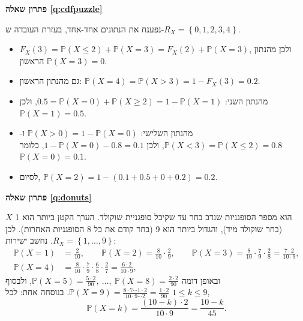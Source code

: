 \documentclass[11pt,a4paper]{report}
\newcommand{\set}[1]{\left\{#1\right\}}
\newcommand{\PP}{\mathbb{P}}
\newenvironment{solution}[1]{\par\bigskip\noindent
  {\sffamily\bfseries\color{thmc}פתרון שאלה \ref{q:#1}}\par\nopagebreak\smallskip}%
  {\par\medskip\noindent{\color{exc!50}\rule{\linewidth}{0.4pt}}\par}
\newcommand{\ans}[1]{\boxed{#1}}
\begin{document}
\begin{solution}{cdfpuzzle}
נפענח את הנתונים אחד-אחד, בעזרת העובדה ש-$R_X=\set{0,1,2,3,4}$.
\begin{itemize}
  \item $F_X(3)=\PP(X\le2)+\PP(X=3)=F_X(2)+\PP(X=3)$, ולכן מהנתון הראשון $\ans{\PP(X=3)=0}$.
  \item גם מהנתון הראשון: $\PP(X=4)=\PP(X>3)=1-F_X(3)=\ans{0.2}$.
  \item מהנתון השני: $0.5=\PP(X=0)+\PP(X\ge2)=1-\PP(X=1)$, ולכן $\ans{\PP(X=1)=0.5}$.
  \item מהנתון השלישי: $\PP(X>0)=1-\PP(X=0)$ ו-$\PP(X<3)=\PP(X\le2)=0.8$, ולכן $1-\PP(X=0)-0.8=0.1$, כלומר $\ans{\PP(X=0)=0.1}$.
  \item לסיום, $\PP(X=2)=1-(0.1+0.5+0+0.2)=\ans{0.2}$.
\end{itemize}
\end{solution}

\begin{solution}{donuts}
$X$ הוא מספר הסופגניות שנדב בחר עד שקיבל סופגניית שוקולד. הערך הקטן ביותר הוא 1 (בחר שוקולד מיד), והגדול ביותר הוא 9 (בחר קודם את כל 8 הסופגניות האחרות). לכן $R_X=\set{1,\dots,9}$. נחשב ישירות:
\[
\begin{aligned}
  \PP(X=1)&=\tfrac2{10},\qquad
  \PP(X=2)=\tfrac8{10}\cdot\tfrac29,\qquad
  \PP(X=3)=\tfrac8{10}\cdot\tfrac79\cdot\tfrac28=\tfrac{7\cdot2}{10\cdot9},\\
  \PP(X=4)&=\tfrac8{10}\cdot\tfrac79\cdot\tfrac68\cdot\tfrac27=\tfrac{6\cdot2}{10\cdot9},
\end{aligned}
\]
ובאופן דומה $\PP(X=5)=\frac{5\cdot2}{90},\ \dots,\ \PP(X=8)=\frac{2\cdot2}{90}$, ולבסוף
$\PP(X=9)=\frac{8\cdot7\cdots1\cdot2}{10\cdot9\cdots2}=\frac{1\cdot2}{90}$. בנוסחה אחת: לכל $1\le k\le9$,
\[
  \PP(X=k)=\frac{(10-k)\cdot2}{10\cdot9}=\ans{\frac{10-k}{45}}.
\]
\end{solution}
\end{document}
